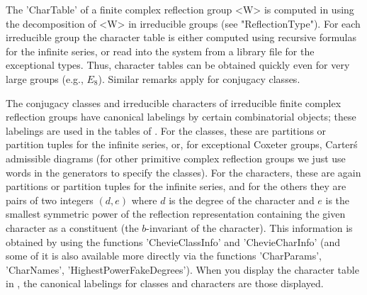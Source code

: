 \def\Sym{{\mathfrak S}}


The  'CharTable' of  a finite  complex reflection  group <W> is computed in
{\CHEVIE}  using  the  decomposition  of  <W>  in  irreducible  groups (see
"ReflectionType"). For each irreducible group the character table is either
computed using recursive formulas for the infinite series, or read into the
system  from  a  library  file  for  the exceptional types. Thus, character
tables  can be obtained  quickly even for  very large groups (e.g., $E_8$).
Similar remarks apply for conjugacy classes.

The  conjugacy  classes  and  irreducible  characters of irreducible finite
complex reflection groups have canonical labelings by certain combinatorial
objects;  these  labelings  are  used  in  the  tables  of \CHEVIE. For the
classes,  these are partitions or partition tuples for the infinite series,
or,   for  exceptional   Coxeter  groups,   Carter\'s  admissible  diagrams
\cite{Car72}  (for other  primitive complex  reflection groups  we just use
words  in the generators to specify the classes). For the characters, these
are  again partitions or partition tuples  for the infinite series, and for
the  others they are pairs of two  integers $(d,e)$ where $d$ is the degree
of  the character and $e$ is the smallest symmetric power of the reflection
representation  containing  the  given  character  as  a  constituent  (the
$b$-invariant  of the character). This information is obtained by using the
functions  'ChevieClassInfo' and 'ChevieCharInfo'  (and some of  it is also
available   more  directly  via  the  functions  'CharParams', 'CharNames',
'HighestPowerFakeDegrees').  When you display the  character table in \GAP,
the canonical labelings for classes and characters are those displayed.

